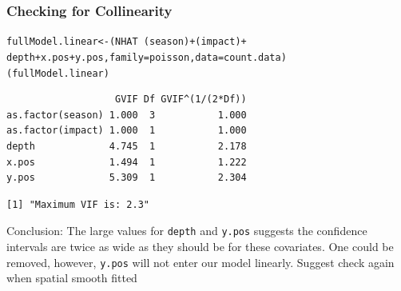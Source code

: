 \begin{frame}[fragile]
\frametitle{Checking for Collinearity}
\begin{knitrout}\footnotesize
{}\color{fgcolor}\begin{kframe}
\begin{alltt}
fullModel.linear <- (NHAT ~ (season) + (impact) + 
    depth + x.pos + y.pos, family = poisson, data =count.data)
(fullModel.linear)
\end{alltt}
\begin{verbatim}
                   GVIF Df GVIF^(1/(2*Df))
as.factor(season) 1.000  3           1.000
as.factor(impact) 1.000  1           1.000
depth             4.745  1           2.178
x.pos             1.494  1           1.222
y.pos             5.309  1           2.304
\end{verbatim}
\end{kframe}
\end{knitrout}

\begin{knitrout}\footnotesize
{}\color{fgcolor}\begin{kframe}
\begin{verbatim}
[1] "Maximum VIF is: 2.3"
\end{verbatim}
\end{kframe}
\end{knitrout}
\begin{block}{Conclusion:}
The large values for {\tt depth} and {\tt y.pos} suggests the confidence intervals are twice as wide as they should be for these covariates. One could be removed, however, {\tt y.pos} will not enter our model linearly.  Suggest check again when spatial smooth fitted
\end{block}
\end{frame}

